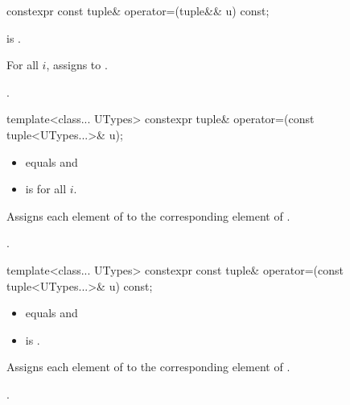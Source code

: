 \documentclass{wg21}
\begin{document}
%
\begin{itemdecl}
    constexpr const tuple& operator=(tuple&& u) const;
\end{itemdecl}

\begin{itemdescr}
    \pnum
    \constraints
     is .

    \pnum
    \effects
    For all $i$,
    assigns  to .

    \pnum
    \returns
    .
\end{itemdescr}

%
\begin{itemdecl}
    template<class... UTypes> constexpr tuple& operator=(const tuple<UTypes...>& u);
\end{itemdecl}

\begin{itemdescr}
    \pnum
    \constraints
    \begin{itemize}
        \item {} equals  and
        \item {} is  for all $i$.
    \end{itemize}

    \pnum
    \effects
    Assigns each element of  to the corresponding element
    of .

    \pnum
    \returns
    .
\end{itemdescr}

%
\begin{itemdecl}
    template<class... UTypes> constexpr const tuple& operator=(const tuple<UTypes...>& u) const;
\end{itemdecl}

\begin{itemdescr}
    \pnum
    \constraints
    \begin{itemize}
        \item
         equals  and
        \item
         is .
    \end{itemize}

    \pnum
    \effects
    Assigns each element of  to the corresponding element of .

    \pnum
    \returns
    .
\end{itemdescr}
\end{document}
